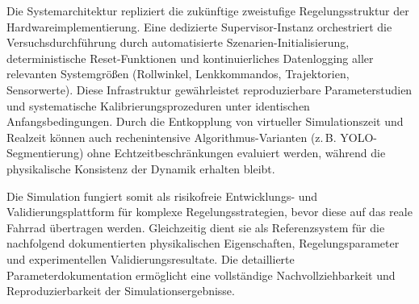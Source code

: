  Die Systemarchitektur repliziert die zukünftige zweistufige Regelungsstruktur der Hardwareimplementierung.
  Eine dedizierte Supervisor-Instanz orchestriert die Versuchsdurchführung durch automatisierte Szenarien-Initialisierung, deterministische 
  Reset-Funktionen und kontinuierliches Datenlogging aller relevanten Systemgrößen (Rollwinkel, Lenkkommandos, Trajektorien, Sensorwerte). 
  Diese Infrastruktur gewährleistet reproduzierbare Parameterstudien und systematische Kalibrierungsprozeduren unter identischen Anfangsbedingungen. 
  Durch die Entkopplung von virtueller Simulationszeit und Realzeit können auch rechenintensive Algorithmus-Varianten (z.\,B. YOLO-Segmentierung) 
  ohne Echtzeitbeschränkungen evaluiert werden, während die physikalische Konsistenz der Dynamik erhalten bleibt.

  Die Simulation fungiert somit als risikofreie Entwicklungs- und Validierungsplattform für komplexe Regelungsstrategien, bevor diese auf 
  das reale Fahrrad übertragen werden. Gleichzeitig dient sie als Referenzsystem für die nachfolgend dokumentierten physikalischen Eigenschaften, 
  Regelungsparameter und experimentellen Validierungsresultate. Die detaillierte Parameterdokumentation ermöglicht eine vollständige 
  Nachvollziehbarkeit und Reproduzierbarkeit der Simulationsergebnisse.

